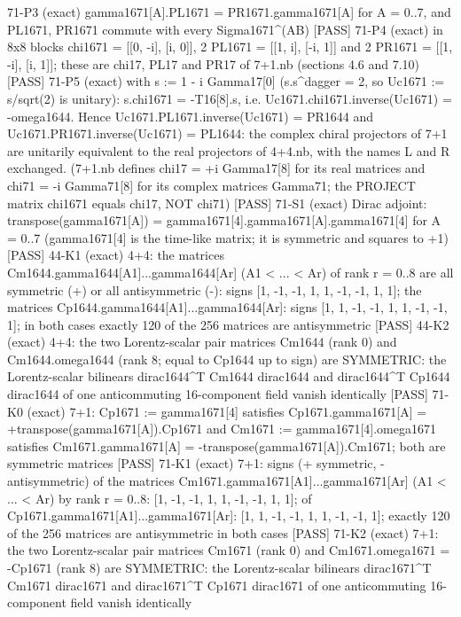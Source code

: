 \documentclass[
  10pt,
]{article}
\newenvironment{Shaded}{}{}
\newcommand{\NormalTok}[1]{#1}
\begin{document}
\begin{Shaded}
\begin{Highlighting}[]
\NormalTok{[PASS] 71{-}P3  (exact) gamma1671[A].PL1671 = PR1671.gamma1671[A] for A = 0..7, and PL1671, PR1671 commute with every Sigma1671\^{}(AB)}
\NormalTok{[PASS] 71{-}P4  (exact) in 8x8 blocks chi1671 = [[0, {-}i], [i, 0]], 2 PL1671 = [[1, i], [{-}i, 1]] and 2 PR1671 = [[1, {-}i], [i, 1]]; these are chi17, PL17 and PR17 of 7+1.nb (sections 4.6 and 7.10)}
\NormalTok{[PASS] 71{-}P5  (exact) with s := 1 {-} i Gamma17[0] (s.s\^{}dagger = 2, so Uc1671 := s/sqrt(2) is unitary): s.chi1671 = {-}T16[8].s, i.e. Uc1671.chi1671.inverse(Uc1671) = {-}omega1644.  Hence Uc1671.PL1671.inverse(Uc1671) = PR1644 and Uc1671.PR1671.inverse(Uc1671) = PL1644: the complex chiral projectors of 7+1 are unitarily equivalent to the real projectors of 4+4.nb, with the names L and R exchanged.  (7+1.nb defines chi17 = +i Gamma17[8] for its real matrices and chi71 = {-}i Gamma71[8] for its complex matrices Gamma71; the PROJECT matrix chi1671 equals chi17, NOT chi71)}
\NormalTok{[PASS] 71{-}S1  (exact) Dirac adjoint: transpose(gamma1671[A]) = gamma1671[4].gamma1671[A].gamma1671[4] for A = 0..7 (gamma1671[4] is the time{-}like matrix; it is symmetric and squares to +1)}
\NormalTok{[PASS] 44{-}K1  (exact) 4+4: the matrices Cm1644.gamma1644[A1]...gamma1644[Ar] (A1 \textless{} ... \textless{} Ar) of rank r = 0..8 are all symmetric (+) or all antisymmetric ({-}): signs [1, {-}1, {-}1, 1, 1, {-}1, {-}1, 1, 1]; the matrices Cp1644.gamma1644[A1]...gamma1644[Ar]: signs [1, 1, {-}1, {-}1, 1, 1, {-}1, {-}1, 1]; in both cases exactly 120 of the 256 matrices are antisymmetric}
\NormalTok{[PASS] 44{-}K2  (exact) 4+4: the two Lorentz{-}scalar pair matrices Cm1644 (rank 0) and Cm1644.omega1644 (rank 8; equal to Cp1644 up to sign) are SYMMETRIC: the Lorentz{-}scalar bilinears dirac1644\^{}T Cm1644 dirac1644 and dirac1644\^{}T Cp1644 dirac1644 of one anticommuting 16{-}component field vanish identically}
\NormalTok{[PASS] 71{-}K0  (exact) 7+1: Cp1671 := gamma1671[4] satisfies Cp1671.gamma1671[A] = +transpose(gamma1671[A]).Cp1671 and Cm1671 := gamma1671[4].omega1671 satisfies Cm1671.gamma1671[A] = {-}transpose(gamma1671[A]).Cm1671; both are symmetric matrices}
\NormalTok{[PASS] 71{-}K1  (exact) 7+1: signs (+ symmetric, {-} antisymmetric) of the matrices Cm1671.gamma1671[A1]...gamma1671[Ar] (A1 \textless{} ... \textless{} Ar) by rank r = 0..8: [1, {-}1, {-}1, 1, 1, {-}1, {-}1, 1, 1]; of Cp1671.gamma1671[A1]...gamma1671[Ar]: [1, 1, {-}1, {-}1, 1, 1, {-}1, {-}1, 1]; exactly 120 of the 256 matrices are antisymmetric in both cases}
\NormalTok{[PASS] 71{-}K2  (exact) 7+1: the two Lorentz{-}scalar pair matrices Cm1671 (rank 0) and Cm1671.omega1671 = {-}Cp1671 (rank 8) are SYMMETRIC: the Lorentz{-}scalar bilinears dirac1671\^{}T Cm1671 dirac1671 and dirac1671\^{}T Cp1671 dirac1671 of one anticommuting 16{-}component field vanish identically}

\end{Highlighting}
\end{Shaded}
\end{document}
